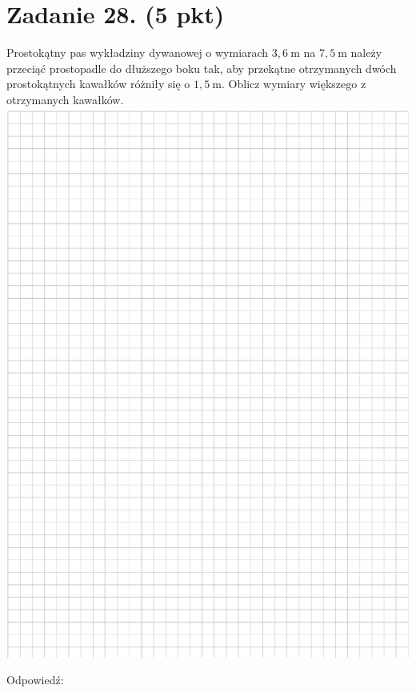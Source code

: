 \documentclass[10pt]{article}
\begin{document}
\section*{Zadanie 28. (5 pkt)}
Prostokątny pas wykładziny dywanowej o wymiarach \(3,6 \mathrm{~m}\) na \(7,5 \mathrm{~m}\) należy przeciąć prostopadle do dłuższego boku tak, aby przekątne otrzymanych dwóch prostokątnych kawałków różniły się o \(1,5 \mathrm{~m}\). Oblicz wymiary większego z otrzymanych kawałków.\\
\includegraphics[max width=\textwidth, center]{2024_11_21_2c2c97b7feae6d70b078g-12}

Odpowiedź: \(\qquad\)
\end{document}
